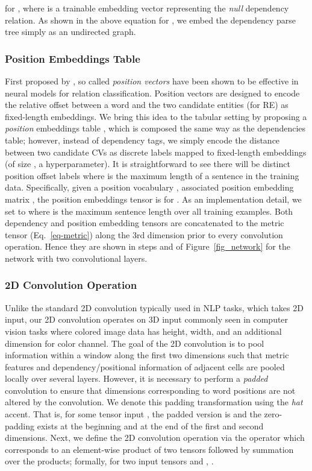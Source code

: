 \documentclass{clv3}
\newcommand*\circled[1]{\tikz[baseline=(char.base)]{
            \node[shape=circle,draw,inner sep=1pt] (char) {#1};}}
\begin{document}
for , where  is a trainable embedding vector representing the \emph{null} dependency relation. As shown in the above equation for , we embed the dependency parse tree simply as an undirected graph. 

\subsubsection{Position Embeddings Table}\label{sec-pos} 

First proposed by , so called \emph{position vectors} have been shown to be effective in neural models for relation classification. Position vectors are designed to encode the relative offset between a word and the two candidate entities (for RE) as fixed-length embeddings. We bring this idea to the tabular setting by proposing a \emph{position} embeddings table , which is composed  the same way as the dependencies table; however, instead of  dependency tags, we simply encode the distance between two candidate CVs as discrete labels mapped to fixed-length embeddings (of size , a hyperparameter). It is straightforward to see there will be  distinct position offset labels where  is the maximum length of a sentence in the training data. Specifically, given a position vocabulary , associated position embedding matrix , the position embeddings tensor is  for . As an implementation detail, we set  to   where  is the maximum sentence length over all training examples. 
Both   dependency and position embedding tensors are concatenated to the metric tensor (Eq.~\eqref{eq-metric}) along the 3rd dimension prior to every convolution operation. Hence they are shown in steps \circled{4} and \circled{6} of Figure~\ref{fig_network} for the network with two convolutional layers. 

\subsubsection{2D Convolution Operation}\label{sec-cnn}

Unlike the standard 2D convolution typically used in NLP tasks, which takes 2D input, our 2D convolution operates on 3D input commonly seen in computer vision tasks where colored image data has height, width, and an additional dimension for color channel. The goal of the 2D convolution is to pool information within a  window along the first two dimensions such that metric features and dependency/positional information of adjacent cells are pooled locally over several layers. However, it is necessary to perform a \emph{padded} convolution to ensure that dimensions corresponding to word positions are not altered by the convolution. We denote this padding transformation using the \emph{hat} accent. That is, for some tensor input , the padded version is  and the zero-padding exists at the beginning and at the end of the first and second dimensions. Next, we define the 2D convolution operation via the   operator which corresponds to an element-wise product of two tensors followed by summation over the products; formally, for two input tensors  and , .
\end{document}
